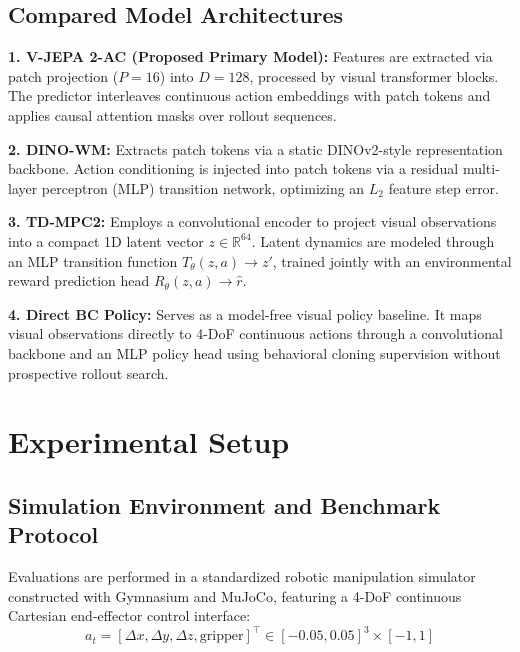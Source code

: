 \documentclass[10pt,journal,compsoc]{IEEEtran}
\begin{document}
\subsection{Compared Model Architectures}

\textbf{1. V-JEPA 2-AC (Proposed Primary Model):} Features are extracted via patch projection ($P=16$) into $D=128$, processed by visual transformer blocks. The predictor interleaves continuous action embeddings with patch tokens and applies causal attention masks over rollout sequences.

\textbf{2. DINO-WM:} Extracts patch tokens via a static DINOv2-style representation backbone. Action conditioning is injected into patch tokens via a residual multi-layer perceptron (MLP) transition network, optimizing an $L_2$ feature step error.

\textbf{3. TD-MPC2:} Employs a convolutional encoder to project visual observations into a compact 1D latent vector $z \in \mathbb{R}^{64}$. Latent dynamics are modeled through an MLP transition function $T_\theta(z, a) \to z'$, trained jointly with an environmental reward prediction head $R_\theta(z, a) \to \hat{r}$.

\textbf{4. Direct BC Policy:} Serves as a model-free visual policy baseline. It maps visual observations directly to 4-DoF continuous actions through a convolutional backbone and an MLP policy head using behavioral cloning supervision without prospective rollout search.

\section{Experimental Setup}

\subsection{Simulation Environment and Benchmark Protocol}

Evaluations are performed in a standardized robotic manipulation simulator constructed with Gymnasium and MuJoCo, featuring a 4-DoF continuous Cartesian end-effector control interface:
\begin{equation}
    a_t = [\Delta x, \Delta y, \Delta z, \text{gripper}]^\top \in [-0.05, 0.05]^3 \times [-1, 1]
\end{equation}
\end{document}
